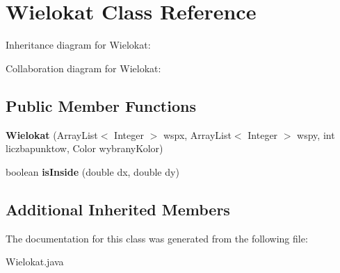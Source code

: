\hypertarget{classWielokat}{}\section{Wielokat Class Reference}
\label{classWielokat}


Inheritance diagram for Wielokat\+:


Collaboration diagram for Wielokat\+:
\subsection*{Public Member Functions}
\begin{DoxyCompactItemize}
\item 
\mbox{\label{classWielokat_a5ccdc43d3c4ae33f587121b22a4c9983}} 
{\bfseries Wielokat} (Array\+List$<$ Integer $>$ wspx, Array\+List$<$ Integer $>$ wspy, int liczbapunktow, Color wybrany\+Kolor)
\item 
\mbox{\label{classWielokat_aa9379795c05e92f4f3a69e2779d5ae5a}} 
boolean {\bfseries is\+Inside} (double dx, double dy)
\end{DoxyCompactItemize}
\subsection*{Additional Inherited Members}


The documentation for this class was generated from the following file\+:\begin{DoxyCompactItemize}
\item 
Wielokat.\+java\end{DoxyCompactItemize}
